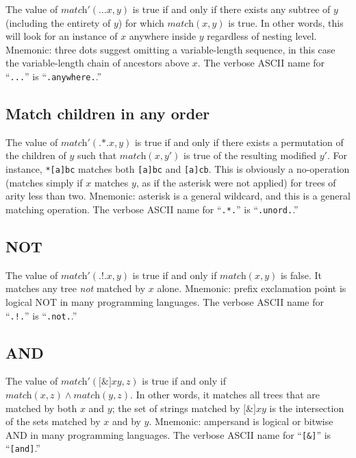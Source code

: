 \documentclass[twocolumn]{report}
\begin{document}
The value of $\textit{match}'(\texttt{...}x,y)$ is true if and only if there
exists any subtree of $y$ (including the entirety of $y$) for which
$\textit{match}(x,y)$ is true.  In other words, this will look for an
instance of $x$ anywhere inside $y$ regardless of nesting level.  Mnemonic:
three dots suggest omitting a variable-length sequence, in this case the
variable-length chain of ancestors above $x$.
The verbose ASCII name for ``\texttt{...}'' is ``\texttt{.anywhere.}.''

\subsection{Match children in any order}

The value of $\textit{match}'(\texttt{.*.}x,y)$ is true if and only if there
exists a permutation of the children of $y$ such that $\textit{match}(x,y')$
is true of the resulting modified $y'$.  For instance, \texttt{*[a]bc}
matches both \texttt{[a]bc} and \texttt{[a]cb}.  This is obviously a
no-operation (matches simply if $x$ matches $y$, as if the asterisk were not
applied) for trees of arity less than two.  Mnemonic: asterisk is a general
wildcard, and this is a general matching operation.
The verbose ASCII name for ``\texttt{.*.}'' is ``\texttt{.unord.}.''

\subsection{NOT}

The value of $\textit{match}'(\texttt{.!.}x,y)$ is true if and only if
$\textit{match}(x,y)$ is false.  It matches any tree \emph{not} matched by
$x$ alone.  Mnemonic:  prefix exclamation point is logical NOT in many
programming languages.
The verbose ASCII name for ``\texttt{.!.}'' is ``\texttt{.not.}.''

\subsection{AND}

The value of $\textit{match}'(\texttt{[\&]}xy,z)$ is true if and only if
$\textit{match}(x,z) \wedge \textit{match}(y,z)$.  In other words, it
matches all trees that are matched by both $x$ and $y$; the set of strings
matched by $\texttt{[\&]}xy$ is the intersection of the sets matched by $x$
and by $y$.  Mnemonic: ampersand is logical or bitwise AND in many
programming languages.
The verbose ASCII name for ``\texttt{[\&]}'' is ``\texttt{[and]}.''
\end{document}
